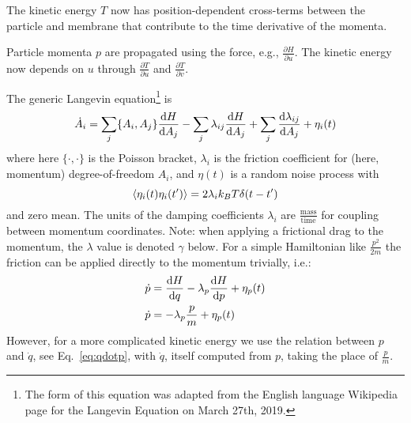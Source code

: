 The kinetic energy $T$ now has position-dependent cross-terms between the particle and membrane that contribute to the time derivative of the momenta.


Particle momenta $p$ are propagated using the force, e.g., $\frac{\partial{H}}{\partial{u}}$.
The kinetic energy now depends on $u$ through $\frac{\partial T}{\partial u}$ and $\frac{\partial T}{\partial v}$.





\label{sec:langevin}
The generic Langevin equation\footnote{The form of this equation was adapted from the English language Wikipedia page for the Langevin Equation on March 27th, 2019.}
is
\begin{equation}
\dot{A}_i = \sum_j \{ A_i, A_j \} \frac{\textrm{d} H}{\textrm{d} A_j} - \sum_j \lambda_{ij} \frac{\textrm{d} H}{\textrm{d} A_j} + \sum_j \frac{ \textrm{d} \lambda_{ij} }{\textrm{d} A_j} + \eta_i(t)
\label{eq:biglangevin}
\end{equation}
where here $\{ \cdot, \cdot \}$ is the Poisson bracket, $\lambda_i$ is the friction coefficient for (here, momentum) degree-of-freedom $A_i$, and $\eta(t)$ is a random noise process with
\begin{equation}
\langle \eta_i(t) \eta_i(t') \rangle = 2 \lambda_i k_B T \delta(t-t')
\end{equation}
and zero mean.
The units of the damping coefficients $\lambda_i$ are $\frac{\textrm{mass}}{\textrm{time}}$ for coupling between momentum coordinates.
Note: when applying a frictional drag to the momentum, the $\lambda$ value is denoted $\gamma$ below.
For a simple Hamiltonian like $\frac{p^2}{2 m}$ the friction can be applied directly to the momentum trivially, i.e.:
\begin{align}
\dot{p} &= \frac{\textrm{d} H}{\textrm{d} q} - \lambda_p \frac{\textrm{d} H}{\textrm{d} p} + \eta_p(t) \\
\dot{p} &= - \lambda_p \frac{p}{m} + \eta_p(t) 
\end{align}
However, for a more complicated kinetic energy we use the relation between $p$ and $\dot{q}$, see Eq.~\ref{eq:qdotp}, with $\dot{q}$, itself computed from $p$, taking the place of $\frac{p}{m}$. 


%
%
%



